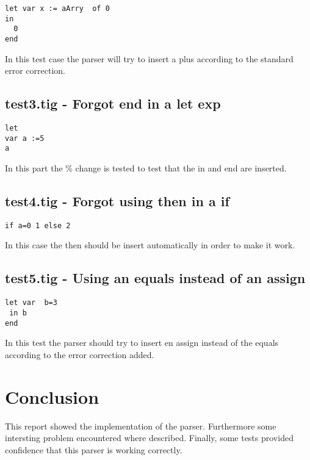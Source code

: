 \documentclass{article}
\begin{document}
\begin{lstlisting}[frame=single]
let var x := aArry  of 0
in
  0
end
\end{lstlisting}

In this test case the parser will try to insert a plus according to the standard error correction.

\subsection{test3.tig - Forgot end in a let exp}
\begin{lstlisting}[frame=single]
let
var a :=5
a
\end{lstlisting}

In this part the \% change is tested to test that the in and end are inserted.

\subsection{test4.tig - Forgot using then in a if}
\begin{lstlisting}[frame=single]
if a=0 1 else 2
\end{lstlisting}

In this case the then should be insert automatically in order to make it work.

\subsection{test5.tig - Using an equals instead of an assign}
\begin{lstlisting}[frame=single]
let var  b=3
 in b
end
\end{lstlisting}

In this test the parser should try to insert en assign instead of the equals according to the error correction added. 

\section{Conclusion}
This report showed the implementation of the parser. Furthermore some intersting problem encountered where described. Finally, some tests provided confidence that this parser is working correctly.
\end{document}
